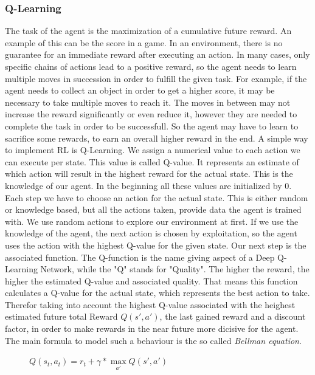 	\subsubsection{Q-Learning}
		The task of the agent is the maximization of a cumulative future reward. An example of this can be the score in a game. In an environment, there is no guarantee for an immediate reward after executing an action. In many cases, only specific chains of actions lead to a positive reward, so the agent needs to learn multiple moves in succession in order to fulfill the given task. For example, if the agent needs to collect an object in order to get a higher score, it may be necessary to take multiple moves to reach it. The moves in between may not increase the reward significantly or even reduce it, however they are needed to complete the task in order to be successfull. So the agent may have to learn to sacrifice some rewards, to earn an overall higher reward in the end. A simple way to implement RL is Q-Learning. We assign a numerical value to each action we can execute per state. This value is called Q-value. It represents an estimate of which action will result in the highest reward for the actual state. This is the knowledge of our agent. In the beginning all these values are initialized by 0. Each step we have to choose an action for the actual state. This is either random or knowledge based, but all the actions taken, provide data the agent is trained with. We use random actions to explore our environment at first. If we use the knowledge of the agent, the next action is chosen by exploitation, so the agent uses the action with the highest Q-value for the given state. Our next step is the associated function. The Q-function is the name giving aspect of a Deep Q-Learning Network, while the "Q" stands for "Quality". The higher the reward, the higher the estimated Q-value and associated quality. That means this function calculates a Q-value for the actual state, which represents the best action to take. Therefor taking into account the highest Q-value associated with the heighest estimated future total Reward $Q(s', a')$, the last gained reward and a discount factor, in order to make rewards in the near future more dicisive for the agent. The main formula to model such a behaviour is the so called \textit{Bellman equation}.
		
		\begin{figure}[h!]
			\begin{center}
				$Q(s_t, a_t) = r_t + \gamma * \max\limits_{a'} Q(s', a')$
			\end{center}
		\end{figure}

